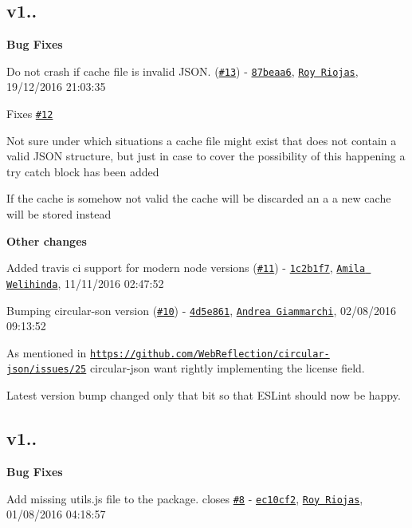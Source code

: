 \subsection*{v1..}


\begin{DoxyItemize}
\item {\bfseries Bug Fixes}
\begin{DoxyItemize}
\item Do not crash if cache file is invalid J\+S\+ON. (\href{https://github.com/royriojas/flat-cache/issues/13}{\tt \#13}) -\/ \href{https://github.com/royriojas/flat-cache/commit/87beaa6}{\tt 87beaa6}, \href{https://github.com/Roy Riojas}{\tt Roy Riojas}, 19/12/2016 21\+:03\+:35

Fixes \href{https://github.com/royriojas/flat-cache/issues/12}{\tt \#12}

Not sure under which situations a cache file might exist that does not contain a valid J\+S\+ON structure, but just in case to cover the possibility of this happening a try catch block has been added

If the cache is somehow not valid the cache will be discarded an a a new cache will be stored instead
\end{DoxyItemize}
\item {\bfseries Other changes}
\begin{DoxyItemize}
\item Added travis ci support for modern node versions (\href{https://github.com/royriojas/flat-cache/issues/11}{\tt \#11}) -\/ \href{https://github.com/royriojas/flat-cache/commit/1c2b1f7}{\tt 1c2b1f7}, \href{https://github.com/Amila Welihinda}{\tt Amila Welihinda}, 11/11/2016 02\+:47\+:52
\item Bumping {\ttfamily circular-\/son} version (\href{https://github.com/royriojas/flat-cache/issues/10}{\tt \#10}) -\/ \href{https://github.com/royriojas/flat-cache/commit/4d5e861}{\tt 4d5e861}, \href{https://github.com/Andrea Giammarchi}{\tt Andrea Giammarchi}, 02/08/2016 09\+:13\+:52

As mentioned in \href{https://github.com/WebReflection/circular-json/issues/25}{\tt https\+://github.\+com/\+Web\+Reflection/circular-\/json/issues/25} {\ttfamily circular-\/json} wan\textquotesingle{}t rightly implementing the license field.

Latest version bump changed only that bit so that E\+S\+Lint should now be happy. \subsection*{v1..}
\end{DoxyItemize}
\item {\bfseries Bug Fixes}
\begin{DoxyItemize}
\item Add missing utils.\+js file to the package. closes \href{https://github.com/royriojas/flat-cache/issues/8}{\tt \#8} -\/ \href{https://github.com/royriojas/flat-cache/commit/ec10cf2}{\tt ec10cf2}, \href{https://github.com/Roy Riojas}{\tt Roy Riojas}, 01/08/2016 04\+:18\+:57
\end{DoxyItemize}
\end{DoxyItemize}

